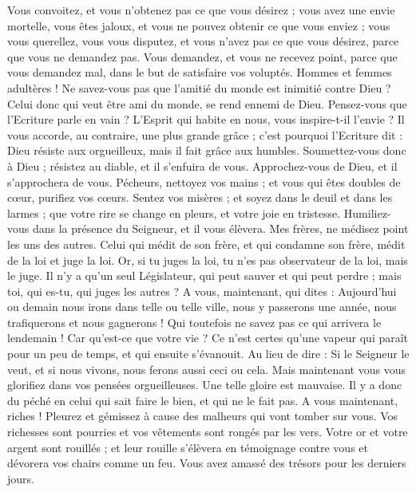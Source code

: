 \begin{multicols}{2}
Vous convoitez, et vous n'obtenez pas ce que vous désirez ; vous avez une envie mortelle, vous êtes jaloux, et vous ne pouvez obtenir ce que vous enviez ; vous vous querellez, vous vous disputez, et vous n'avez pas ce que vous désirez, parce que vous ne demandez pas.
Vous demandez, et vous ne recevez point, parce que vous demandez mal, dans le but de satisfaire vos voluptés.
Hommes et femmes adultères ! Ne savez-vous pas que l'amitié du monde est inimitié contre Dieu ? Celui donc qui veut être ami du monde, se rend ennemi de Dieu.
Pensez-vous que l'Ecriture parle en vain ? L'Esprit qui habite en nous, vous inspire-t-il l'envie ?
Il vous accorde, au contraire, une plus grande grâce ; c'est pourquoi l'Ecriture dit : Dieu résiste aux orgueilleux, mais il fait grâce aux humbles.
Soumettez-vous donc à Dieu ; résistez au diable, et il s'enfuira de vous.
Approchez-vous de Dieu, et il s'approchera de vous. Pécheurs, nettoyez vos mains ; et vous qui êtes doubles de cœur, purifiez vos cœurs.
Sentez vos misères ; et soyez dans le deuil et dans les larmes ; que votre rire se change en pleurs, et votre joie en tristesse.
Humiliez-vous dans la présence du Seigneur, et il vous élèvera.
Mes frères, ne médisez point les uns des autres. Celui qui médit de son frère, et qui condamne son frère, médit de la loi et juge la loi. Or, si tu juges la loi, tu n'es pas observateur de la loi, mais le juge.
Il n'y a qu'un seul Législateur, qui peut sauver et qui peut perdre ; mais toi, qui es-tu, qui juges les autres ?
A vous, maintenant, qui dites : Aujourd'hui ou demain nous irons dans telle ou telle ville, nous y passerons une année, nous trafiquerons et nous gagnerons !
Qui toutefois ne savez pas ce qui arrivera le lendemain ! Car qu'est-ce que votre vie ? Ce n'est certes qu'une vapeur qui paraît pour un peu de temps, et qui ensuite s'évanouit.
Au lieu de dire : Si le Seigneur le veut, et si nous vivons, nous ferons aussi ceci ou cela.
Mais maintenant vous vous glorifiez dans vos pensées orgueilleuses. Une telle gloire est mauvaise.
Il y a donc du péché en celui qui sait faire le bien, et qui ne le fait pas.
\VerseOne{}A vous maintenant, riches ! Pleurez et gémissez à cause des malheurs qui vont tomber sur vous.
Vos richesses sont pourries et vos vêtements sont rongés par les vers.
Votre or et votre argent sont rouillés ; et leur rouille s'élèvera en témoignage contre vous et dévorera vos chairs comme un feu. Vous avez amassé des trésors pour les derniers jours.

\end{multicols}
